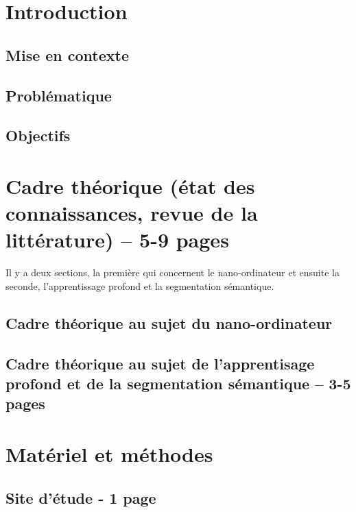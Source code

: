 \documentclass[12pt, letterpaper]{article}
\begin{document}
\newpage
{}

\section{Introduction}
\subsection{Mise en contexte}

\subsection{Problématique}

\subsection{Objectifs}


\section{Cadre théorique (état des connaissances, revue de la littérature) -- 5-9 pages}
Il y a deux sections, la première qui concernent le nano-ordinateur et ensuite la seconde, l'apprentissage profond et la segmentation sémantique.
\subsection{Cadre théorique au sujet du nano-ordinateur}

\subsection{Cadre théorique au sujet de l'apprentisage profond et de la segmentation sémantique -- 3-5 pages}


\section{Matériel et méthodes}
\subsection{Site d'étude - 1 page}

\end{document}
